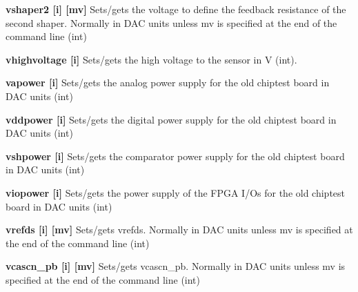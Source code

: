 \begin{DoxyItemize}
\item {\bfseries vshaper2 \mbox{[}i\mbox{]} \mbox{[}mv\mbox{]}} Sets/gets the voltage to define the feedback resistance of the second shaper. Normally in DAC units unless {\ttfamily mv} is specified at the end of the command line (int)
\end{DoxyItemize}


\begin{DoxyItemize}
\item {\bfseries vhighvoltage \mbox{[}i\mbox{]}} Sets/gets the high voltage to the sensor in V (int).
\end{DoxyItemize}


\begin{DoxyItemize}
\item {\bfseries vapower \mbox{[}i\mbox{]}} Sets/gets the analog power supply for the old chiptest board in DAC units (int)
\end{DoxyItemize}


\begin{DoxyItemize}
\item {\bfseries vddpower \mbox{[}i\mbox{]}} Sets/gets the digital power supply for the old chiptest board in DAC units (int)
\end{DoxyItemize}


\begin{DoxyItemize}
\item {\bfseries vshpower \mbox{[}i\mbox{]}} Sets/gets the comparator power supply for the old chiptest board in DAC units (int)
\end{DoxyItemize}


\begin{DoxyItemize}
\item {\bfseries viopower \mbox{[}i\mbox{]}} Sets/gets the power supply of the FPGA I/Os for the old chiptest board in DAC units (int)
\end{DoxyItemize}


\begin{DoxyItemize}
\item {\bfseries vrefds \mbox{[}i\mbox{]} \mbox{[}mv\mbox{]}} Sets/gets vrefds. Normally in DAC units unless {\ttfamily mv} is specified at the end of the command line (int)
\end{DoxyItemize}


\begin{DoxyItemize}
\item {\bfseries vcascn\_\-pb \mbox{[}i\mbox{]} \mbox{[}mv\mbox{]}} Sets/gets vcascn\_\-pb. Normally in DAC units unless {\ttfamily mv} is specified at the end of the command line (int)
\end{DoxyItemize}


